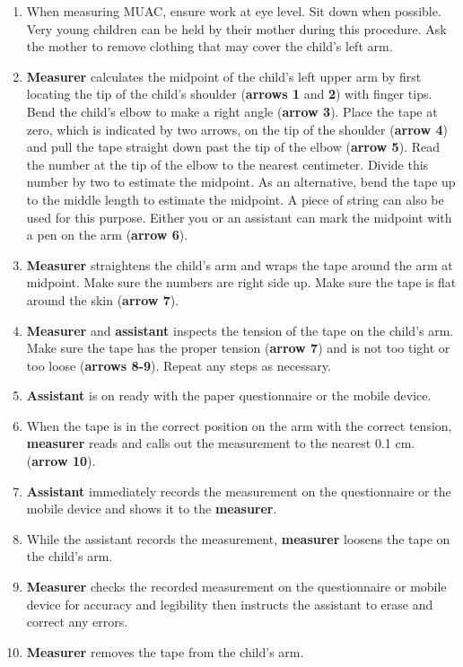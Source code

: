 \documentclass[12pt,]{book}
\theoremstyle{definition}
\theoremstyle{definition}
\theoremstyle{definition}
\theoremstyle{remark}
\begin{document}
\begin{enumerate}
\def\labelenumi{\arabic{enumi}.}
\item
  When measuring MUAC, ensure work at eye level. Sit down when possible.
  Very young children can be held by their mother during this procedure.
  Ask the mother to remove clothing that may cover the child's left arm.
\item
  \textbf{Measurer} calculates the midpoint of the child's left upper
  arm by first locating the tip of the child's shoulder (\textbf{arrows
  1} and \textbf{2}) with finger tips. Bend the child's elbow to make a
  right angle (\textbf{arrow 3}). Place the tape at zero, which is
  indicated by two arrows, on the tip of the shoulder (\textbf{arrow 4})
  and pull the tape straight down past the tip of the elbow
  (\textbf{arrow 5}). Read the number at the tip of the elbow to the
  nearest centimeter. Divide this number by two to estimate the
  midpoint. As an alternative, bend the tape up to the middle length to
  estimate the midpoint. A piece of string can also be used for this
  purpose. Either you or an assistant can mark the midpoint with a pen
  on the arm (\textbf{arrow 6}).
\item
  \textbf{Measurer} straightens the child's arm and wraps the tape
  around the arm at midpoint. Make sure the numbers are right side up.
  Make sure the tape is flat around the skin (\textbf{arrow 7}).
\item
  \textbf{Measurer} and \textbf{assistant} inspects the tension of the
  tape on the child's arm. Make sure the tape has the proper tension
  (\textbf{arrow 7}) and is not too tight or too loose (\textbf{arrows
  8-9}). Repeat any steps as necessary.
\item
  \textbf{Assistant} is on ready with the paper questionnaire or the
  mobile device.
\item
  When the tape is in the correct position on the arm with the correct
  tension, \textbf{measurer} reads and calls out the measurement to the
  nearest 0.1 cm. (\textbf{arrow 10}).
\item
  \textbf{Assistant} immediately records the measurement on the
  questionnaire or the mobile device and shows it to the
  \textbf{measurer}.
\item
  While the assistant records the measurement, \textbf{measurer} loosens
  the tape on the child's arm.
\item
  \textbf{Measurer} checks the recorded measurement on the questionnaire
  or mobile device for accuracy and legibility then instructs the
  assistant to erase and correct any errors.
\item
  \textbf{Measurer} removes the tape from the child's arm.
\end{enumerate}
\end{document}
